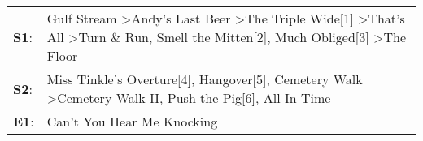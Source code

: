 \begin{supertabular}{p{0.03\textwidth}p{0.92\textwidth}}
 \textbf{S1}:  &  Gulf Stream\textsuperscript{} \textgreater \enspace Andy's Last Beer\textsuperscript{} \textgreater \enspace The Triple Wide[1]\textsuperscript{} \textgreater \enspace That's All\textsuperscript{} \textgreater \enspace Turn \& Run\textsuperscript{}, \enspace Smell the Mitten[2]\textsuperscript{}, \enspace Much Obliged[3]\textsuperscript{} \textgreater \enspace The Floor\textsuperscript{}  \enspace  \\
 \textbf{S2}:  &                                                                                                                              Miss Tinkle's Overture[4]\textsuperscript{}, \enspace Hangover[5]\textsuperscript{}, \enspace Cemetery Walk\textsuperscript{} \textgreater \enspace Cemetery Walk II\textsuperscript{}, \enspace Push the Pig[6]\textsuperscript{}, \enspace All In Time\textsuperscript{}  \enspace  \\
 \textbf{E1}:  &                                                                                                                                                                                                                                                                                                                                                            Can't You Hear Me Knocking\textsuperscript{}  \enspace  \\
\end{supertabular}
